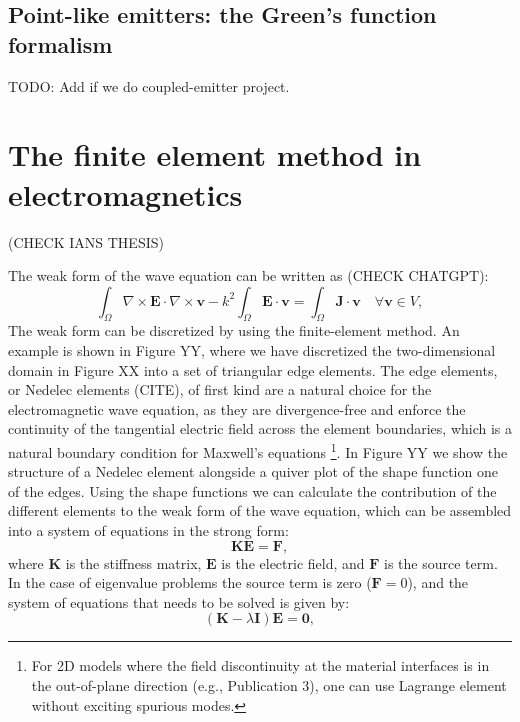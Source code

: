 \subsection*{Point-like emitters: the Green's function formalism}

TODO: Add if we do coupled-emitter project.

\section{The finite element method in electromagnetics}

(CHECK IANS THESIS)

The weak form of the wave equation can be written as (CHECK CHATGPT):
\begin{equation}
    \int_{\Omega} \nabla \times \mathbf{E} \cdot \nabla \times \mathbf{v} - k^2 \int_{\Omega} \mathbf{E} \cdot \mathbf{v} = \int_{\Omega} \mathbf{J} \cdot \mathbf{v} \quad \forall \mathbf{v} \in V,
\end{equation}
The weak form can be discretized by using the finite-element method. An example is shown in Figure YY, 
where we have discretized the two-dimensional domain in Figure XX into a set of triangular edge elements. 
The edge elements, or Nedelec elements (CITE), of first kind are a natural choice for the electromagnetic 
wave equation, as they are divergence-free and enforce the continuity of the tangential electric field 
across the element boundaries, which is a natural boundary condition for Maxwell's equations 
\footnote{For 2D models where the field discontinuity at the material interfaces 
is in the out-of-plane direction (e.g., Publication 3), one can use Lagrange element without 
exciting spurious modes.}. In Figure YY
we show the structure of a Nedelec element alongside a quiver plot of the shape function one of the edges.
Using the shape functions we can calculate the contribution of the different elements to the weak form of the
wave equation, which can be assembled into a system of equations in the strong form:
\begin{equation}
    \mathbf{K} \mathbf{E} = \mathbf{F},
\end{equation}
where $\mathbf{K}$ is the stiffness matrix, $\mathbf{E}$ is the electric field, and $\mathbf{F}$ is the source
 term. In the case of eigenvalue problems the source term is zero ($\mathbf{F}=0$), and the system of equations 
that needs to be solved is given by:
\begin{equation}
    \left(\mathbf{K} - \lambda \mathbf{I} \right) \mathbf{E} =  \mathbf{0},
\end{equation}

